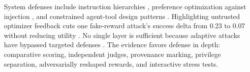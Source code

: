 System defenses include instruction hierarchies \citep{wallace2024instruction}, preference optimization against injection \citep{chen2025secaligndefendingpromptinjection}, and constrained agent-tool design patterns \citep{beurer2025design}. Highlighting untrusted optimizer feedback cuts one fake-reward attack's success delta from 0.23 to 0.07 without reducing utility \citep{zhao2025are}. No single layer is sufficient because adaptive attacks have bypassed targeted defenses \citep{zhan2025adaptive}. The evidence favors defense in depth: comparative scoring, independent judges, provenance marking, privilege separation, adversarially reshaped rewards, and interactive stress tests.

